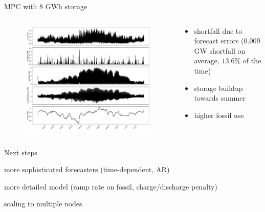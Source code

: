 \documentclass[aspectratio=169,11pt]{beamer}
\begin{document}
\begin{frame}{MPC with $8$ GWh storage}
\begin{columns}
    \begin{column}{0.6\textwidth}
        \begin{figure}
            \centering
            \includegraphics[width=\columnwidth]{./figures/mpc_hourly_profiles.pdf}
        \end{figure}
    \end{column}
    \begin{column}{0.4\textwidth}
        \begin{itemize}
            \item shortfall due to forecast errors
            ($0.009$ GW shortfall on average, $13.6\%$ of the time)
            \item storage buildup towards summer
            \item higher fossil use
        \end{itemize}
    \end{column}
\end{columns}
\end{frame}

\begin{frame}{Next steps} 
\BIT
\item more sophisticated forecasters (time-dependent, AR)
\item more detailed model (ramp rate on fossil, charge/discharge penalty)
\item scaling to multiple nodes
\EIT
\end{frame}
    
\end{document}
